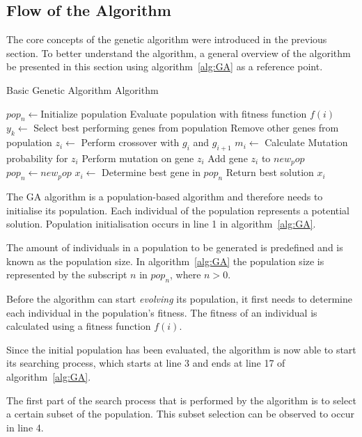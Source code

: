 \subsection{Flow of the Algorithm}
The core concepts of the genetic algorithm were introduced in the previous section. To better understand the algorithm, a general overview of the algorithm be presented in this section using algorithm~\ref{alg:GA} as a reference point.
\begin{algorithm}[H]
\caption{Basic Genetic Algorithm Algorithm\cite{FamilyGA,AdaptiveSAGA,DistributedHierarchicalGA,SelfAdaptiveGA}}
\label{alg:GA}
	\begin{algorithmic}[1]
		\State $pop_n\leftarrow$Initialize population
		\State Evaluate population with fitness function $f(i)$
		\State $y_k \leftarrow$ Select best performing genes from population
		\State Remove other genes from population
		\Repeat
				\State $z_i \leftarrow$ Perform crossover with $g_i$ and $g_{i+1}$
				\State $m_i\leftarrow$ Calculate Mutation probability for $z_i$
					\State Perform mutation on gene $z_i$
				\EndIf
				\State Add gene $z_i$ to $new_pop$
			\EndFor
		\State $pop_n \leftarrow new_pop$
		\EndWhile
		\State $x_i \leftarrow$ Determine best gene in $pop_n$
		\State Return best solution $x_i$
	\end{algorithmic}
\end{algorithm}
The GA algorithm is a population-based algorithm and therefore needs to initialise its population. Each individual of the population represents a potential solution. Population initialisation occurs in line 1 in algorithm~\ref{alg:GA}. 

The amount of individuals in a population to be generated is predefined and is known as the population size. In algorithm~\ref{alg:GA} the population size is represented by the subscript $n$ in $pop_n$, where $n > 0$.

Before the algorithm can start \emph{evolving} its population, it first needs to determine each individual in the population's fitness. The fitness of an individual is calculated using a fitness function $f(i)$.

Since the initial population has been evaluated, the algorithm is now able to start its searching process, which starts at line 3 and ends at line 17 of algorithm~\ref{alg:GA}.

The first part of the search process that is performed by the algorithm is to select a certain subset of the population. This subset selection can be observed to occur in line 4.

